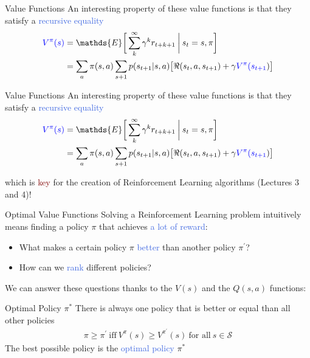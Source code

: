 \documentclass{beamer}
\begin{document}
\begin{frame}{Value Functions}
	An interesting property of these value functions is that they satisfy a \textcolor{RoyalBlue}{recursive equality}
		\begin{align*}
			\textcolor{blue}{V^{\pi}(s)} & = \mathds{E} \bigg[\sum_{k}^{\infty}\gamma^{k} r_{t+k+1} \: \bigg| \: s_t=s,\pi \bigg] \\
			   & = \sum_a \pi(s,a) \sum_{s+1} p(s_{t+1}|s,a)\big[\Re(s_t, a, s_{t+1}) + \gamma \textcolor{blue}{V^{\pi}(s_{t+1}}) \big] 
		\end{align*}
\end{frame}


\begin{frame}{Value Functions}
	An interesting property of these value functions is that they satisfy a \textcolor{RoyalBlue}{recursive equality}
		\begin{align*}
		\textcolor{blue}{V^{\pi}(s)} & = \mathds{E} \bigg[\sum_{k}^{\infty}\gamma^{k} r_{t+k+1} \: \bigg| \: s_t=s,\pi \bigg] \\
			   & = \sum_a \pi(s,a) \sum_{s+1} p(s_{t+1}|s,a)\big[\Re(s_t, a, s_{t+1}) + \gamma \textcolor{blue}{V^{\pi}(s_{t+1}}) \big] 
		\end{align*}

	which is \textcolor{Maroon}{key} for the creation of Reinforcement Learning algorithms (Lectures 3 and 4)!
\end{frame}


\begin{frame}{Optimal Value Functions}
	Solving a Reinforcement Learning problem intuitively means finding a policy $\pi$ that achieves \textcolor{RoyalBlue}{a lot of reward}:
	\begin{itemize}
		\item What makes a certain policy $\pi$ \textcolor{RoyalBlue}{better} than another policy $\pi^{'}$? 
		\item How can we \textcolor{RoyalBlue}{rank} different policies?
	\end{itemize}
	
	We can answer these questions thanks to the $V(s)$ and the $Q(s,a)$ functions:

	\begin{block}{Optimal Policy $\pi^*$}
		There is always one policy that is better or equal than all other policies
	\begin{align*}
		\pi \geq \pi^{'}\: \text{iff}\: V^{\pi}(s) \geq V^{\pi^{'}}(s) \: \text{for all}\: s\in\mathcal{S}
	\end{align*}
		The best possible policy is the \textcolor{RoyalBlue}{optimal policy} $\pi^{*}$
	\end{block}
\end{frame}
\end{document}
